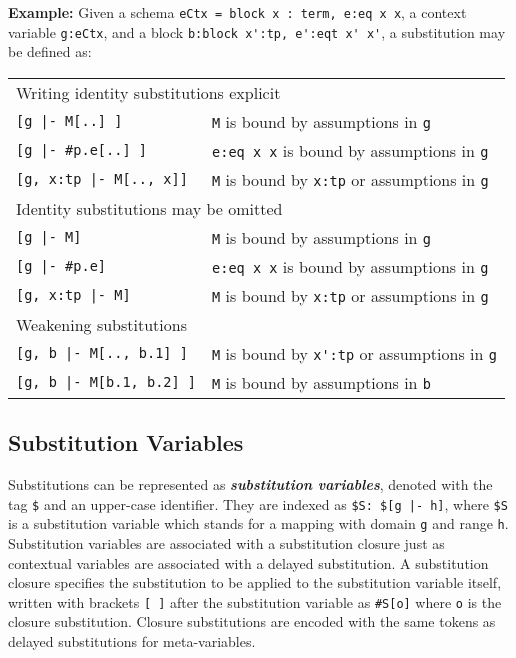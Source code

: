 \documentclass[11pt]{article}
\begin{document}
\textbf{Example:} Given a schema \verb+eCtx = block x : term, e:eq x x+, a context variable \verb+g:eCtx+, and a block \verb+b:block x':tp, e':eqt x' x'+, a substitution may be defined as:

\begin{center}
\begin{tabular}{ l l}
\multicolumn{2}{l}{Writing identity substitutions explicit}\\[0.5em]
\verb+[g |- M[..] ]+ & \verb+M+ is bound by assumptions in \verb+g+\\
\verb+[g |- #p.e[..] ]+ & \verb+e:eq x x+ is bound by assumptions in \verb+g+\\
\verb+[g, x:tp |- M[.., x]]+ & \verb+M+ is bound by \verb+x:tp+ or assumptions in \verb+g+ \\[1em]
\multicolumn{2}{l}{Identity substitutions may be omitted}\\[0.5em]
\verb+[g |- M]+ & \verb+M+ is bound by assumptions in \verb+g+\\
\verb+[g |- #p.e]+ & \verb+e:eq x x+ is bound by assumptions in \verb+g+\\
\verb+[g, x:tp |- M]+ & \verb+M+ is bound by \verb+x:tp+ or assumptions in \verb+g+ \\[1em]
\multicolumn{2}{l}{Weakening substitutions}\\[0.5em]
\verb+[g, b |- M[.., b.1] ]+ & \verb+M+ is bound by \verb+x':tp+ or assumptions in \verb+g+ \\
\verb+[g, b |- M[b.1, b.2] ]+ & \verb+M+ is bound by assumptions in \verb+b+ \\
\end{tabular}
\end{center}



\subsection{Substitution Variables}

Substitutions can be represented as \textit{\textbf{substitution variables}}, denoted with the tag \verb+$+ and an upper-case identifier.
They are indexed as \verb+$S: $[g |- h]+, where \verb+$S+ is a substitution variable which stands for a mapping with domain \verb+g+ and range \verb+h+.
Substitution variables are associated with a substitution closure just as contextual variables are associated with a delayed substitution.
A substitution closure specifies the substitution to be applied to the substitution variable itself, written with brackets \verb+[ ]+ after the substitution variable as \verb+#S[o]+ where \verb+o+ is the closure substitution.
Closure substitutions are encoded with the same tokens as delayed substitutions for meta-variables.
\end{document}
